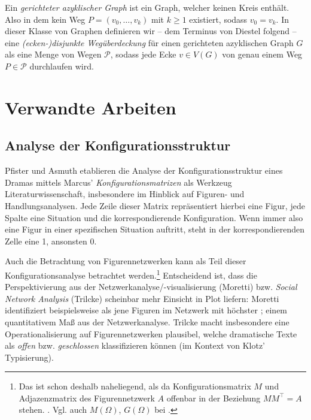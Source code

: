 \documentclass[a4paper,10pt,abstract=true,headings=small]{scrartcl}
\newcommand{\eng}[1]{\textenglish{\emph{#1}}}
\begin{document}
Ein \emph{gerichteter azyklischer Graph} ist ein Graph, welcher keinen Kreis enthält.
Also in dem kein Weg $P=(v_0, \dots, v_k)$ mit $k\geq 1$ existiert, sodass $v_0=v_k$.
In dieser Klasse von Graphen definieren wir – dem Terminus von Diestel folgend – eine \emph{(ecken-\nolinebreak{})disjunkte Wegüberdeckung} für einen gerichteten azyklischen Graph $G$ als eine Menge von Wegen $\mathcal{P}$, sodass jede Ecke $v\in V(G)$ von genau einem Weg $P\in\mathcal{P}$ durchlaufen wird.\autocite[55]{diestel_graphentheorie_2006} %


\section{Verwandte Arbeiten}\label{sec:verwandte-arbeiten}

\subsection{Analyse der Konfigurationsstruktur}

Pfister und Asmuth etablieren die Analyse der Konfigurationsstruktur eines Dramas mittels Marcus' \emph{Konfigurationsmatrizen} als Werkzeug  Literaturwissenschaft, insbesondere im Hinblick auf Figuren- und Handlungsanalysen. %
Jede Zeile dieser Matrix repräsentiert hierbei eine Figur, jede Spalte eine Situation und die korrespondierende Konfiguration.
Wenn immer also eine Figur in einer spezifischen Situation auftritt, steht in der korrespondierenden Zelle eine 1, ansonsten 0.\autocites[Vgl.][140--141]{marcus_mathematisch-linguistisches_1971}[Vgl.][236--240]{pfister_drama:_2001}[Vgl.][44--47]{asmuth_einfuhrung_2016}

Auch die Betrachtung von Figurennetzwerken kann als Teil dieser Konfigurationsanalyse betrachtet werden.\footnote{Das ist schon deshalb naheliegend, als da Konfigurationsmatrix $M$ und Adjazenzmatrix des Figurennetzwerk $A$ offenbar in der Beziehung $MM^\intercal=A$ stehen. \cite[Siehe auch][201--203, 221--222]{trilcke_social_2013}. Vgl. auch $M(\Omega)$, $G(\Omega)$ bei \cite[140--142]{marcus_mathematisch-linguistisches_1971}.}
Entscheidend ist, dass die Perspektivierung aus der Netzwerkanalyse/-visualisierung (Moretti) bzw. \emph{Social Network Analysis} (Trilcke) scheinbar mehr Einsicht in Plot liefern:
Moretti identifiziert beispielsweise \textquote{\eng{protagonists}} als jene Figuren im Netzwerk mit höchster \textquote{\eng{closeness centrality}}; einem quantitativem Maß aus der Netzwerkanalyse.\autocite{moretti_network_2011} %
Trilcke macht insbesondere eine Operationalisierung auf Figurennetzwerken plausibel, welche dramatische Texte als \emph{offen} bzw. \emph{geschlossen} klassifizieren können (im Kontext von Klotz' Typisierung).\autocite{trilcke_social_2013}
\end{document}
